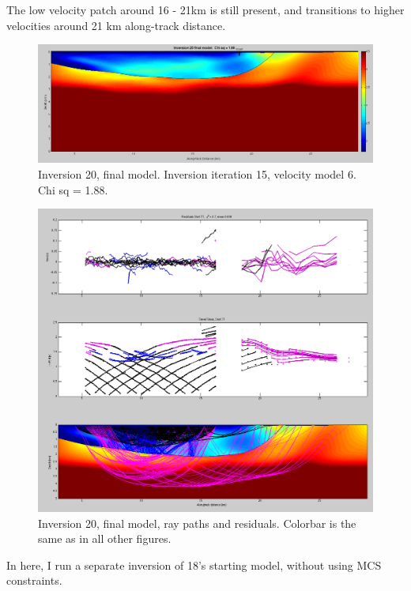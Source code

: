 \documentclass[fontsize=11pt, %
                             paper=a4, %
                             twoside, %
                             captions=tableheading,
                             index=totoc,
                             hyperref]{labbook}
\begin{document}
\begin{addmargin}[4cm]{0cm}
The low velocity patch around 16 - 21km is still present, and transitions to higher velocities around 21 km along-track distance. 

\begin{figure}[h!]
\raggedleft
\includegraphics[scale=0.3,keepaspectratio=true]{figs/inv20final.png}
\caption{Inversion 20, final model.  Inversion iteration 15, velocity model 6.  Chi sq = 1.88.}
\label{fig:inv20final}
\end{figure} 

\begin{figure}[h!]
\raggedleft
\includegraphics[scale=0.3,keepaspectratio=true]{figs/inv20finalRay.png}
\caption{Inversion 20, final model, ray paths and residuals. Colorbar is the same as in all other figures.}
\label{fig:inv20finalray}
\end{figure} 

\clearpage{}


In here, I run a separate inversion of 18's starting model, without using MCS constraints.


\end{addmargin}
\end{document}
